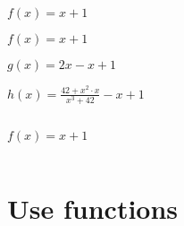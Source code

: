 \documentclass[aspectratio=169]{beamer}
\newcommand{\style}[1]{\ttfamily#1}
\begin{document}
\begin{frame}
  \centering
  \Huge
  $f(x) = x + 1$
\end{frame}

\begin{frame}
  \centering
  \Huge
  $f(x) = x + 1$

  $g(x) = 2x - x + 1$

  $h(x) = \frac{42 + x^2\cdot{}x}{x^3+42} - x + 1$
\end{frame}

\begin{frame}[fragile]
  \begin{columns}
    \begin{column}{0.5\textwidth}
      \LARGE
      $f(x) = x + 1$
    \end{column}
    \begin{column}{0.5\textwidth}
      
    \end{column}
  \end{columns}
\end{frame}

\begin{frame}[fragile]
  
\end{frame}

\begin{frame}[fragile]
  
\end{frame}

\begin{frame}[fragile]
  
\end{frame}

\section{Use functions}

\begin{frame}[fragile]
  
  \vspace{1.5cm}
  
\end{frame}

\begin{frame}[fragile]
  
  \vspace{1.5cm}
  
\end{frame}
\end{document}
